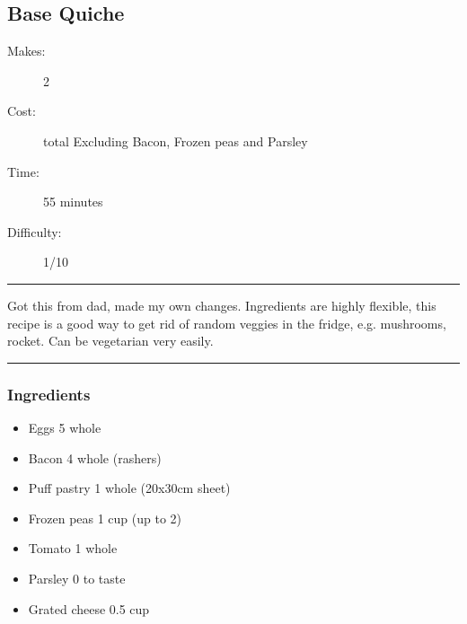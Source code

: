 \documentclass[]{article}
\begin{document}
\subsection*{\center\huge Base Quiche}
\begin{description}
\item[Makes:] 2 
\item[Cost:]  total Excluding Bacon, Frozen peas and Parsley
\item[Time:] 55 minutes
\item[Difficulty:] 1/10
\end{description}
\vspace{0.2cm}\hrule\vspace{0.5cm}
\begin{adjustwidth}{0.5 cm}{0.5 cm}

Got this from dad, made my own changes. Ingredients are highly flexible, this recipe is a good way to get rid of random veggies in the fridge, e.g. mushrooms, rocket. Can be vegetarian very easily. \hfill\color{accent}{\Large\faHeart\hspace{0.1cm}}\color{black}

\end{adjustwidth}
\vspace{0.5cm}\hrule
\subsubsection*{\Large Ingredients}
\begin{multicols}{2}
\begin{itemize}
 \item Eggs \hfill 5 whole
 \item Bacon \hfill 4 whole (rashers)
 \item Puff pastry \hfill 1 whole (20x30cm sheet)
 \item Frozen peas \hfill 1 cup (up to 2)
 \item Tomato \hfill 1 whole
 \item Parsley \hfill 0 to taste
 \item Grated cheese \hfill 0.5 cup
\end{itemize}
\end{multicols}
\end{document}
